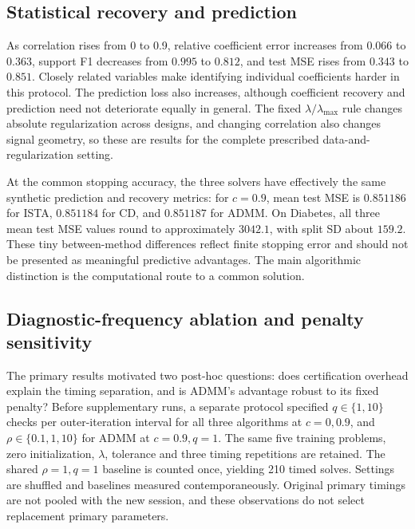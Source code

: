 \documentclass{article}
\newcommand{\resultdir}{../outputs/formal_20261119T120859Z}
\begin{document}
\subsection{Statistical recovery and prediction}
\begin{table}[ht]
\centering\footnotesize

\caption{Synthetic data properties and recovery at high-accuracy reference solutions, mean $\pm$ sample SD across five seeds. $\kappa_2(X)$ is the condition number of the standardized training design.}
\label{tab:recovery}
\end{table}

As correlation rises from 0 to 0.9, relative coefficient error increases from $0.066$ to $0.363$, support F1 decreases from $0.995$ to $0.812$, and test MSE rises from $0.343$ to $0.851$. Closely related variables make identifying individual coefficients harder in this protocol. The prediction loss also increases, although coefficient recovery and prediction need not deteriorate equally in general. The fixed $\lambda/\lambda_{\max}$ rule changes absolute regularization across designs, and changing correlation also changes signal geometry, so these are results for the complete prescribed data-and-regularization setting.


At the common stopping accuracy, the three solvers have effectively the same synthetic prediction and recovery metrics: for $c=0.9$, mean test MSE is $0.851186$ for ISTA, $0.851184$ for CD, and $0.851187$ for ADMM. On Diabetes, all three mean test MSE values round to approximately $3042.1$, with split SD about $159.2$. These tiny between-method differences reflect finite stopping error and should not be presented as meaningful predictive advantages. The main algorithmic distinction is the computational route to a common solution.

\FloatBarrier
\subsection{Diagnostic-frequency ablation and penalty sensitivity}
The primary results motivated two post-hoc questions: does certification overhead explain the timing separation, and is ADMM's advantage robust to its fixed penalty? Before supplementary runs, a separate protocol specified $q\in\{1,10\}$ checks per outer-iteration interval for all three algorithms at $c=0,0.9$, and $\rho\in\{0.1,1,10\}$ for ADMM at $c=0.9,q=1$. The same five training problems, zero initialization, $\lambda$, tolerance and three timing repetitions are retained. The shared $\rho=1,q=1$ baseline is counted once, yielding 210 timed solves. Settings are shuffled and baselines measured contemporaneously. Original primary timings are not pooled with the new session, and these observations do not select replacement primary parameters.
\end{document}
